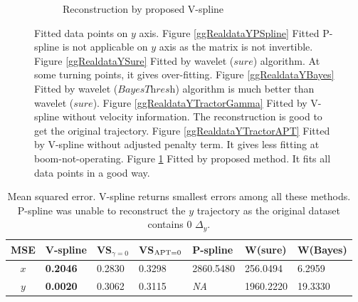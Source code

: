 \begin{figure}
\begin{subfigure}{0.45\textwidth}
    \caption{Reconstruction by proposed V-spline}\label{ggRealdataYTractor}
    \end{subfigure}
\caption{Fitted data points on $y$ axis. Figure \ref{ggRealdataYPSpline} Fitted P-spline is not applicable on $y$ axis as the matrix is not invertible. Figure \ref{ggRealdataYSure} Fitted by wavelet ($\textit{sure}$) algorithm. At some turning points, it gives over-fitting. Figure \ref{ggRealdataYBayes} Fitted by wavelet ($\textit{BayesThresh}$) algorithm is much better than wavelet ($\textit{sure}$). Figure \ref{ggRealdataYTractorGamma} Fitted by V-spline without velocity information. The reconstruction is good to get the original trajectory. Figure \ref{ggRealdataYTractorAPT} Fitted by V-spline without adjusted penalty term. It gives less fitting at boom-not-operating. Figure \ref{ggRealdataYTractor} Fitted by proposed method. It fits all data points in a good way.}\label{1dy}
 \end{figure}

\begin{table}
\caption{Mean squared error. V-spline returns smallest errors among all these methods. P-spline was unable to reconstruct the $y$ trajectory as the original dataset contains 0 $\Delta_y$.} \label{1dxymse}
	\setlength\tabcolsep{1.5pt}
\begin{center}
 	\begin{tabular}{|c|C{2cm}|C{2cm}|C{2cm}|C{2cm}|C{2cm}|C{2cm}|}
 		\hline
 		MSE   &  V-spline & VS$_{\gamma=0}$ & VS$_{\scriptsize \mbox{APT=0}}$  & P-spline &  W(sure) & W(Bayes)\\ \hline 
	\textit{$x$}   &  \textbf{0.2046} & 0.2830 & 0.3298     & 2860.5480   & 256.0494  & 6.2959  \\ \hline
	\textit{$y$}   &  \textbf{0.0020} & 0.3062 & 0.3115     & \textit{NA} & 1960.2220 & 19.3330  \\ \hline
 	\end{tabular}
 \end{center}
\end{table}

